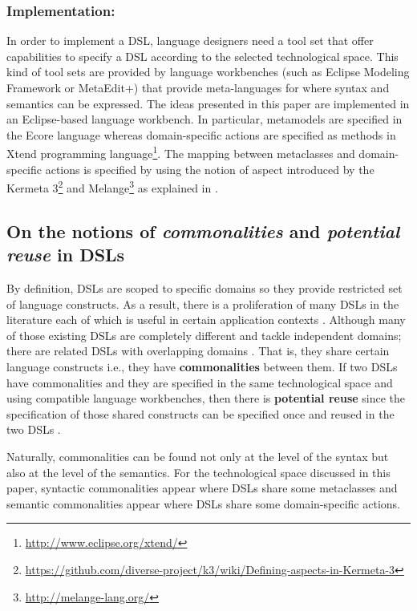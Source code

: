 \vspace{-2mm}
\subsubsection{Implementation:} In order to implement a DSL, language designers need a tool set that offer capabilities to specify a DSL according to the selected technological space. This kind of tool sets are provided by language workbenches (such as Eclipse Modeling Framework or MetaEdit+) that provide meta-languages for where syntax and semantics can be expressed. The ideas presented in this paper are implemented in an Eclipse-based language workbench. In particular, metamodels are specified in the Ecore language whereas domain-specific actions are specified as methods in Xtend programming language\footnote{\url{http://www.eclipse.org/xtend/}}. The mapping between metaclasses and domain-specific actions is specified by using the notion of aspect introduced by the Kermeta 3\footnote{\url{https://github.com/diverse-project/k3/wiki/Defining-aspects-in-Kermeta-3}} and Melange\footnote{\url{http://melange-lang.org/}} as explained in \cite{degueule:2015}. 

\subsection{On the notions of \textit{commonalities} and \textit{potential reuse} in DSLs}

By definition, DSLs are scoped to specific domains so they provide restricted set of language constructs. As a result, there is a proliferation of many DSLs in the literature each of which is useful in certain application contexts \cite{Mernik:2005b}. Although many of those existing DSLs are completely different and tackle independent domains; there are related DSLs with overlapping domains \cite[p. 60-61]{voelter:2013}. That is, they share certain language constructs i.e., they have \textbf{commonalities} between them. If two DSLs have commonalities and they are specified in the same technological space and using compatible language workbenches, then there is \textbf{potential reuse} since the specification of those shared constructs can be specified once and reused in the two DSLs \cite[p. 60-61]{voelter:2013}.

Naturally, commonalities can be found not only at the level of the syntax but also at the level of the semantics. For the technological space discussed in this paper, syntactic commonalities appear where DSLs share some metaclasses and semantic commonalities appear where DSLs share some domain-specific actions.


